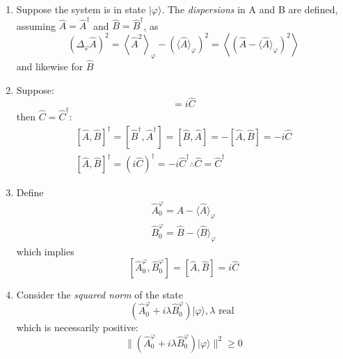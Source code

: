 \documentclass[12pt]{article}
\begin{document}
\begin{enumerate}
\item Suppose the system is in state $|\varphi\rangle$. The
\emph{dispersions} in A and B are defined,
assuming 
$\hat{A}=\hat{A}^{\dagger}$ and $\hat{B}=\hat{B}^{\dagger}$,
as
\begin{equation}
\left(\Delta_{\varphi} \hat{A}\right)^{2}=\left\langle\hat{A}^{2}\right\rangle_{\varphi}-\left(\langle\hat{A}\rangle_{\varphi}\right)^{2}=\left\langle\left(\hat{A}-\langle\hat{A}\rangle_{\varphi}\right)^{2}\right\rangle
\end{equation}
and likewise for $\hat{B}$
%
\item Suppose:
\begin{equation}
[\hat{A}, \hat{B}]=i \hat{C}
\end{equation}
then $\hat{C} = \hat{C}^{\dagger}$:
\begin{equation}
\begin{gathered}
[\hat{A}, \hat{B}]^{\dagger}=\left[\hat{B}^{\dagger},\hat{A}^{\dagger}\right]=[\hat{B}, \hat{A}]=-[\hat{A}, \hat{B}] = - i\hat{C}\\ 
[\hat{A}, \hat{B}]^{\dagger} = (i \hat{C})^{\dagger} = -i \hat{C}^{\dagger} 
\therefore \hat{C}=\hat{C}^{\dagger} 
\end{gathered}
\end{equation}
%
\item Define
\begin{equation}
\begin{array}{l}\hat{A}_{0}^{\varphi}=\hat{A}-\langle\hat{A}\rangle_{\varphi} \\ \hat{B}_{0}^{\varphi}=\hat{B}-\langle\hat{B}\rangle_{\varphi}\end{array}
\end{equation}
which implies
\begin{equation}
\left[\hat{A}_{0}^{\varphi}, \hat{B}_{0}^{\varphi}\right]=[\hat{A}, \hat{B}]=i \hat{C}
\end{equation}
%
\item Consider the \emph{squared norm} of the state
\begin{equation}
\left(\hat{A}_{0}^{\varphi}+i \lambda \hat{B}_{0}^{\varphi}\right)|\varphi\rangle, \lambda \textrm { real }
\end{equation}
which is necessarily positive:
\begin{equation}
\|\left(\hat{A}_{0}^{\varphi}+i \lambda \hat{B}_{0}^{\varphi}\right)|\varphi\rangle \|^{2} \geqslant 0
\label{eq:g23}
\end{equation}

\end{enumerate}
\end{document}

